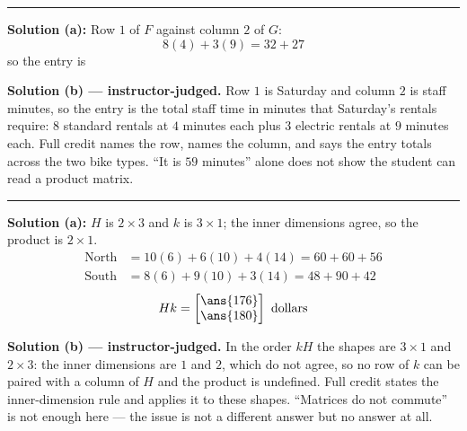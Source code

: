 \documentclass[12pt]{article}
\begin{document}
\vspace{0.2cm}\noindent\rule{\linewidth}{0.2pt}


\textbf{Solution (a):} Row $1$ of $F$ against column $2$ of $G$:
\[ 8(4) + 3(9) = 32 + 27 \]
so the entry is 

\vspace{0.15cm}
\textbf{Solution (b) --- instructor-judged.} Row $1$ is Saturday and column $2$ is staff
minutes, so the entry is the total staff time in minutes that Saturday's rentals require:
$8$ standard rentals at $4$ minutes each plus $3$ electric rentals at $9$ minutes each.
Full credit names the row, names the column, and says the entry totals across the two bike
types. ``It is $59$ minutes'' alone does not show the student can read a product matrix.

\vspace{0.2cm}\noindent\rule{\linewidth}{0.2pt}


\textbf{Solution (a):} $H$ is $2 \times 3$ and $k$ is $3 \times 1$; the inner dimensions
agree, so the product is $2 \times 1$.
\begin{align*}
  \text{North} &= 10(6) + 6(10) + 4(14) = 60 + 60 + 56 \\
  \text{South} &= 8(6) + 9(10) + 3(14) = 48 + 90 + 42
\end{align*}
\[ Hk = \begin{bmatrix} \ans{176} \\ \ans{180} \end{bmatrix} \text{ dollars} \]

\vspace{0.15cm}
\textbf{Solution (b) --- instructor-judged.} In the order $kH$ the shapes are $3 \times 1$
and $2 \times 3$: the inner dimensions are $1$ and $2$, which do not agree, so no row of $k$
can be paired with a column of $H$ and the product is undefined. Full credit states the
inner-dimension rule and applies it to these shapes. ``Matrices do not commute'' is not
enough here --- the issue is not a different answer but no answer at all.
\end{document}

